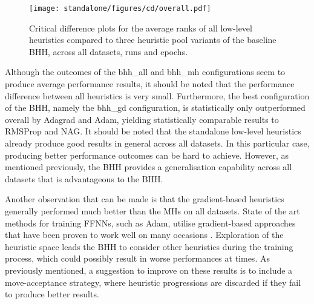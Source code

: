 \begin{figure}[htb]
	\centering
	\texttt{[image: standalone/figures/cd/overall.pdf]}
	\caption{Critical difference plots for the average ranks of all low-level heuristics compared to three heuristic pool variants of the baseline \acs{BHH}, across all datasets, runs and epochs.}
	\label{fig:results:standalone:descriptive:cd}
\end{figure}

Although the outcomes of the bhh\_all and bhh\_mh configurations seem to produce average performance results, it should be noted that the performance difference between all heuristics is very small. Furthermore, the best configuration of the \acs{BHH}, namely the bhh\_gd configuration, is statistically only outperformed overall by \acs{Adagrad} and \acs{Adam}, yielding statistically comparable results to \acs{RMSProp} and \acs{NAG}. It should be noted that the standalone low-level heuristics already produce good results in general across all datasets. In this particular case, producing better performance outcomes can be hard to achieve. However, as mentioned previously, the \acs{BHH} provides a generalisation capability across all datasets that is advantageous to the \acs{BHH}.

Another observation that can be made is that the gradient-based heuristics generally performed much better than the \acp{MH} on all datasets. State of the art methods for training \acp{FFNN}, such as \acs{Adam}, utilise gradient-based approaches that have been proven to work well on many occasions \cite{ref:kingma:2014}. Exploration of the heuristic space leads the \acs{BHH} to consider other heuristics during the training process, which could possibly result in worse performances at times. As previously mentioned, a suggestion to improve on these results is to include a move-acceptance strategy, where heuristic progressions are discarded if they fail to produce better results.